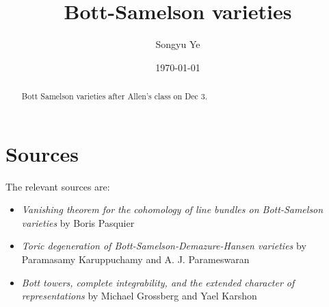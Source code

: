 \documentclass[12pt]{article}
\begin{document}
\rhead{\today}
\cfoot{\thepage}

\title{Bott-Samelson varieties}

\author{Songyu Ye}
\date{\today}
\maketitle


\begin{abstract}
Bott Samelson varieties after Allen's class on Dec 3. 
\end{abstract}

\tableofcontents



\section{Sources}
The relevant sources are:
\begin{itemize}
    \item \textit{Vanishing theorem for the cohomology of line bundles on Bott-Samelson varieties} by Boris Pasquier
    \item \textit{Toric degeneration of Bott-Samelson-Demazure-Hansen varieties} by Paramasamy Karuppuchamy and A. J. Parameswaran
    \item \textit{Bott towers, complete integrability, and the extended character of representations} by Michael Grossberg and Yael Karshon
\end{itemize}
\end{document}
